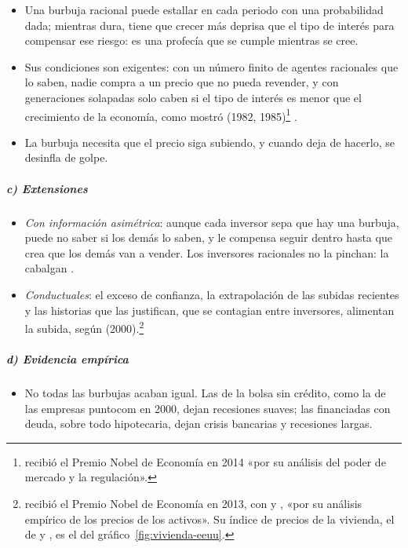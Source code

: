 \documentclass[11pt]{article}
\begin{document}
\begin{itemize}
  \item Una burbuja racional puede estallar en cada periodo con una probabilidad dada; mientras dura, tiene que crecer más deprisa que el tipo de interés para compensar ese riesgo: es una profecía que se cumple mientras se cree.
  \item Sus condiciones son exigentes: con un número finito de agentes racionales que lo saben, nadie compra a un precio que no pueda revender, y con generaciones solapadas solo caben si el tipo de interés es menor que el crecimiento de la economía, como mostró  (1982, 1985)\nocite{Tirole1982Possibility,Tirole1985Asset}\footnote{ recibió el Premio Nobel de Economía en 2014 «por su análisis del poder de mercado y la regulación»\nocite{Nobel2014Tirole}.} .
  \item La burbuja necesita que el precio siga subiendo, y cuando deja de hacerlo, se desinfla de golpe.
\end{itemize}

\subparagraph{c) Extensiones}

\begin{itemize}
\item \emph{Con información asimétrica}: aunque cada inversor sepa que hay una burbuja, puede no saber si los demás lo saben, y le compensa seguir dentro hasta que crea que los demás van a vender\nocite{AbreuBrunnermeier2003}. Los inversores racionales no la pinchan: la cabalgan .
\item \emph{Conductuales}: el exceso de confianza, la extrapolación de las subidas recientes y las historias que las justifican, que se contagian entre inversores, alimentan la subida, según  (2000)\nocite{Shiller2000Irrational}.\footnote{ recibió el Premio Nobel de Economía en 2013, con  y , «por su análisis empírico de los precios de los activos»\nocite{Nobel2013FamaHansenShiller}. Su índice de precios de la vivienda, el de  y , es el del gráfico~\ref{fig:vivienda-eeuu}.}
\end{itemize}

\subparagraph{d) Evidencia empírica}

\begin{itemize}
\item No todas las burbujas acaban igual. Las de la bolsa sin crédito, como la de las empresas puntocom en 2000, dejan recesiones suaves; las financiadas con deuda, sobre todo hipotecaria, dejan crisis bancarias y recesiones largas\nocite{JordaSchularickTaylor2015}.
\end{itemize}
\end{document}
